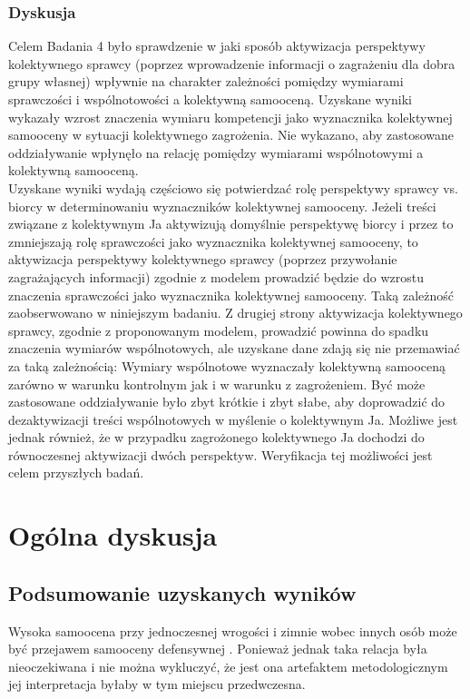 \documentclass[man]{apa6}
\begin{document}
\subsubsection{Dyskusja}
Celem Badania 4 było sprawdzenie w jaki sposób aktywizacja perspektywy kolektywnego sprawcy (poprzez wprowadzenie informacji o zagrażeniu dla dobra grupy własnej) wpływnie na charakter zależności pomiędzy wymiarami sprawczości i wspólnotowości a kolektywną samooceną. Uzyskane wyniki wykazały wzrost znaczenia wymiaru kompetencji jako wyznacznika kolektywnej samooceny w sytuacji kolektywnego zagrożenia. Nie wykazano, aby zastosowane oddziaływanie wpłynęło na relację pomiędzy wymiarami wspólnotowymi a kolektywną samooceną.\\
Uzyskane wyniki wydają częściowo się potwierdzać rolę perspektywy sprawcy vs. biorcy w determinowaniu wyznaczników kolektywnej samooceny. Jeżeli treści związane z kolektywnym Ja aktywizują domyślnie perspektywę biorcy i przez to zmniejszają rolę sprawczości jako wyznacznika kolektywnej samooceny, to aktywizacja perspektywy kolektywnego sprawcy (poprzez przywołanie zagrażających informacji) zgodnie z modelem \textcite{wojciszke2011self} prowadzić będzie do wzrostu znaczenia sprawczości jako wyznacznika kolektywnej samooceny. Taką zależność zaobserwowano w niniejszym badaniu. Z drugiej strony aktywizacja kolektywnego sprawcy, zgodnie z proponowanym modelem, prowadzić powinna do spadku znaczenia wymiarów wspólnotowych, ale uzyskane dane zdają się nie przemawiać za taką zależnością: Wymiary wspólnotowe wyznaczały kolektywną samooceną zarówno w warunku kontrolnym jak i w warunku z zagrożeniem. Być może zastosowane oddziaływanie było zbyt krótkie i zbyt słabe, aby doprowadzić do dezaktywizacji treści wspólnotowych w myślenie o kolektywnym Ja. Możliwe jest jednak również, że w przypadku zagrożonego kolektywnego Ja dochodzi do równoczesnej aktywizacji dwóch perspektyw. Weryfikacja tej możliwości jest celem przyszłych badań. \\






\section{Ogólna dyskusja}
\subsection{Podsumowanie uzyskanych wyników}

Wysoka samoocena przy jednoczesnej wrogości i zimnie wobec innych osób może być przejawem samooceny defensywnej \parencite[zob.][]{raskin1991narcissistic}. Ponieważ jednak taka relacja była nieoczekiwana i nie można wykluczyć, że jest ona artefaktem metodologicznym jej interpretacja byłaby w tym miejscu przedwczesna.
\end{document}
